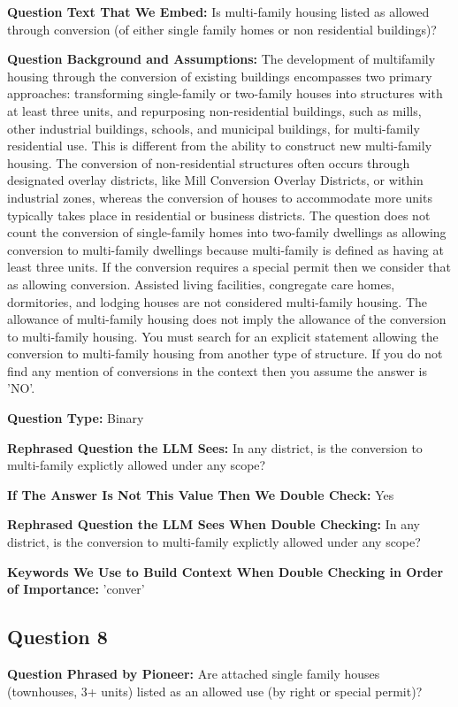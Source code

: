 \noindent\textbf{Question Text That We Embed:} Is multi-family housing listed as allowed through conversion (of either single family homes or non residential buildings)?

\noindent\textbf{Question Background and Assumptions:} The development of multifamily housing through the conversion of existing buildings encompasses two primary approaches: transforming single-family or two-family houses into structures with at least three units, and repurposing non-residential buildings, such as mills, other industrial buildings, schools, and municipal buildings, for multi-family residential use. This is different from the ability to construct new multi-family housing. The conversion of non-residential structures often occurs through designated overlay districts, like Mill Conversion Overlay Districts, or within industrial zones, whereas the conversion of houses to accommodate more units typically takes place in residential or business districts. The question does not count the conversion of single-family homes into two-family dwellings as allowing conversion to multi-family dwellings because multi-family is defined as having at least three units. If the conversion requires a special permit then we consider that as allowing conversion.  Assisted living facilities, congregate care homes, dormitories, and lodging houses are not considered multi-family housing. The allowance of multi-family housing does not imply the allowance of the conversion to multi-family housing. You must search for an explicit statement allowing the conversion to multi-family housing from another type of structure. If you do not find any mention of conversions in the context then you assume the answer is 'NO'.

\noindent\textbf{Question Type:} Binary

\noindent\textbf{Rephrased Question the LLM Sees:} In any district, is the conversion to multi-family explictly allowed under any scope?


\noindent\textbf{If The Answer Is Not This Value Then We Double Check:} Yes

\noindent\textbf{Rephrased Question the LLM Sees When Double Checking:} In any district, is the conversion to multi-family explictly allowed under any scope?


\noindent\textbf{Keywords We Use to Build Context When Double Checking in Order of Importance:}
\noindent 'conver'
\vspace{1cm}
\subsection*{Question 8}
\noindent\textbf{Question Phrased by Pioneer:} Are attached single family houses (townhouses, 3+ units) listed as an allowed use (by right or special permit)?

